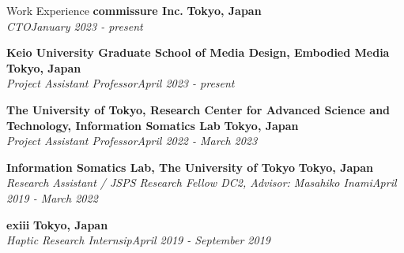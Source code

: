 \documentclass{resume} %
\begin{document}
\begin{rSection}{Work Experience}
{\bf commissure Inc.} \hfill {\bf Tokyo, Japan} 
\\{\em CTO}\hfill {\em January 2023 - present} 

{\bf Keio University Graduate School of Media Design, Embodied Media} \hfill {\bf Tokyo, Japan} 
\\{\em Project Assistant Professor}\hfill {\em April 2023 - present} 

{\bf The University of Tokyo, Research Center for Advanced Science and Technology, Information Somatics Lab} \hfill {\bf Tokyo, Japan} 
\\{\em Project Assistant Professor}\hfill {\em April 2022 - March 2023} 

{\bf Information Somatics Lab, The University of Tokyo} \hfill {\bf Tokyo, Japan} 
\\{\em  Research Assistant / JSPS Research Fellow DC2, Advisor: Masahiko Inami}\hfill {\em April 2019 - March 2022} 

{\bf exiii } \hfill {\bf Tokyo, Japan} 
\\{\em Haptic Research Internsip}\hfill  {\em April 2019 - September 2019} 


\end{rSection}
\end{document}
